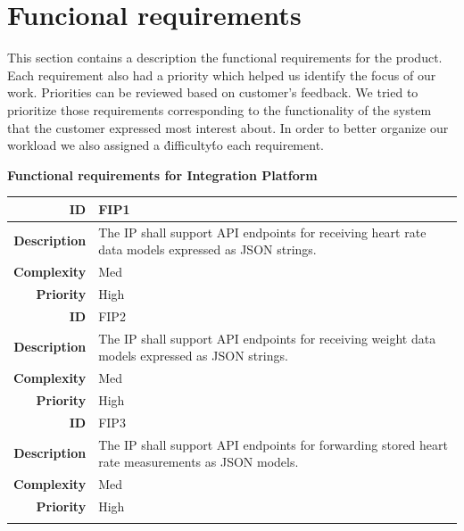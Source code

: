 \section{Funcional requirements}
\label{section:functionalreq}

This section contains a description the functional requirements for the product.
Each requirement also had a priority which helped us identify the focus of our work.
Priorities can be reviewed based on customer's feedback. We tried to prioritize those requirements corresponding
to the functionality of the system that the customer expressed most interest about. In order to better organize
our workload we also assigned a \'difficulty\' to each requirement.

\textbf{Functional requirements for Integration Platform}

\begin{table}[H]
\begin{center}
\begin{tabular}{ | r | p{11.5cm} | }
  \hline

  \textbf{ID} & FIP1 \\
  \hline\noalign{\smallskip}\hline
  \textbf{Description}  & The IP shall support API endpoints for receiving heart rate data
                          models expressed as JSON strings.\\
  \textbf{Complexity}   & Med \\
  \textbf{Priority}     & High \\
  \hline\noalign{\smallskip}\noalign{\smallskip}\hline

  \textbf{ID} & FIP2 \\
  \hline\noalign{\smallskip}\hline
  \textbf{Description}  & The IP shall support API endpoints for receiving
                          weight data models expressed as JSON strings.\\
  \textbf{Complexity}   & Med \\
  \textbf{Priority}     & High \\
  \hline\noalign{\smallskip}\noalign{\smallskip}\hline

  \textbf{ID} & FIP3 \\
  \hline\noalign{\smallskip}\hline
  \textbf{Description}  & The IP shall support API endpoints for forwarding
                          stored heart rate measurements as JSON models.\\
  \textbf{Complexity}   & Med \\
  \textbf{Priority}     & High \\
  \hline\noalign{\smallskip}\noalign{\smallskip}\hline


\end{tabular}
\end{center}
\end{table}
